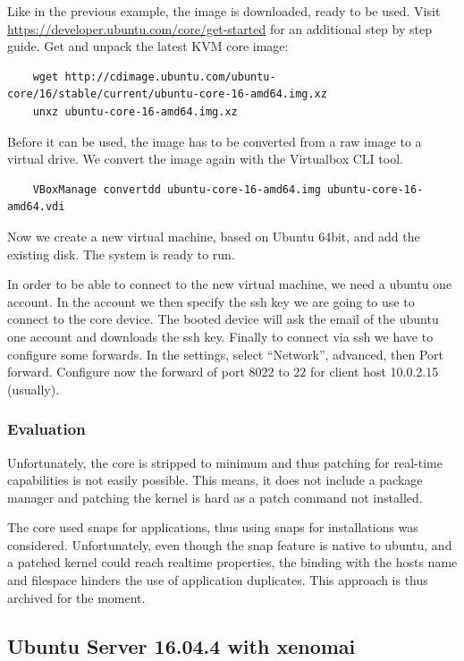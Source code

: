 \documentclass[]{scrartcl}
\begin{document}
Like in the previous example, the image is downloaded, ready to be used. Visit \url{https://developer.ubuntu.com/core/get-started} for an additional step by step guide.
Get and unpack the latest KVM core image:

\begin{verbatim}
	wget http://cdimage.ubuntu.com/ubuntu-core/16/stable/current/ubuntu-core-16-amd64.img.xz
	unxz ubuntu-core-16-amd64.img.xz
\end{verbatim}

Before it can be used, the image has to be converted from a raw image to a virtual drive. We convert the image again with the Virtualbox CLI tool.

\begin{verbatim}
	VBoxManage convertdd ubuntu-core-16-amd64.img ubuntu-core-16-amd64.vdi
\end{verbatim}

Now we create a new virtual machine, based on Ubuntu 64bit, and add the existing disk. The system is ready to run.

In order to be able to connect to the new virtual machine, we need a ubuntu one account. In the account we then specify the ssh key we are going to use to connect to the core device. The booted device will ask the email of the ubuntu one account and downloads the ssh key. Finally to connect via ssh we have to configure some forwards. In the settings, select ``Network'', advanced, then Port forward. Configure now the forward of port 8022 to 22 for client host 10.0.2.15 (usually).

\subsubsection{Evaluation}

Unfortunately, the core is stripped to minimum and thus patching for real-time capabilities is not easily possible. This means, it does not include a package manager and patching the kernel is hard as a patch command not installed.

The core used snaps for applications, thus using snaps for installations was considered. Unfortunately, even though the snap feature is native to ubuntu, and a patched kernel could reach realtime properties, the binding with the hosts name and filespace hinders the use of application duplicates. This approach is thus archived for the moment.

\subsection{Ubuntu Server 16.04.4 with xenomai}
\end{document}
